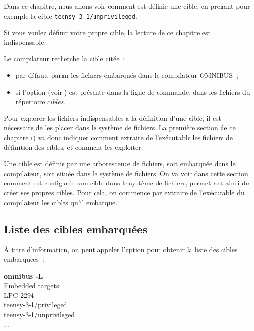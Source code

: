 





Dans ce chapitre, nous allons voir comment est définie une cible, en prenant pour exemple la cible \texttt{teensy-3-1/unprivileged}.

Si vous voulez définir votre propre cible, la lecture de ce chapitre est indispensable.

Le compilateur recherche la cible citée~:
\begin{itemize}
  \item par défaut, parmi les fichiers embarqués dans le compilateur OMNIBUS~;
  \item si l'option  (voir ) est présente dans la ligne de commande, dans les fichiers du répertoire $cibles$.
\end{itemize}

Pour explorer les fichiers indispensables à la définition d'une cible, il est nécessaire de les placer dans le système de fichiers. La première section de ce chapitre () va donc indiquer comment extraire de l'exécutable les fichiers de définition des cibles, et comment les exploiter.



Une cible est définie par une arborescence de fichiers, soit embarquée dans le compilateur, soit située dans le système de fichiers. On va voir dans cette section comment est configurée une cible dans le système de fichiers, permettant ainsi de créer ses propres cibles. Pour cela, on commence par extraire de l'exécutable du compilateur les cibles qu'il embarque.

\subsection{Liste des cibles embarquées}
À titre d'information, on peut appeler l'option  pour obtenir la liste des cibles embarquées~:
\begin{SHELL}
{\bfseries omnibus -L}\\
Embedded targets:\\
\hspace*{1.2em}LPC-2294\\
\hspace*{1.2em}teensy-3-1/privileged\\
\hspace*{1.2em}teensy-3-1/unprivileged\\
\hspace*{1.2em}...
\end{SHELL}

